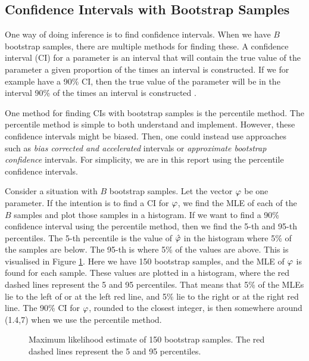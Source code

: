 
\subsection{Confidence Intervals with Bootstrap Samples}
\label{theory_ci_bootstrap}
One way of doing inference is to find confidence intervals. When we have $B$ bootstrap samples, there are multiple methods for finding these.  
A confidence interval (CI) for a parameter is an interval that will contain the true value of the parameter a given proportion of the times an interval is constructed. If we for example have a 90\% CI, then the true value of the parameter will be in the interval 90\% of the times an interval is constructed \citep{bootstrap}.

One method for finding CIs with bootstrap samples is the percentile method. The percentile method is simple to both understand and implement. However, these confidence intervals might be biased. Then, one could instead use approaches such as \textit{bias corrected and accelerated} intervals or \textit{approximate bootstrap confidence} intervals. For simplicity, we are in this report using the percentile confidence intervals. 


Consider a situation with $B$ bootstrap samples. Let the vector $\varphi$ be one parameter. If the intention is to find a CI for $\varphi$, we find the MLE of each of the $B$ samples and plot those samples in a histogram. If we want to find a 90\% confidence interval using the percentile method, then we find the 5-th and 95-th percentiles. The 5-th percentile is the value of $\hat{\varphi}$ in the histogram where 5\% of the samples are below. The 95-th is where 5\% of the values are above. This is visualised in Figure \ref{percentile_ci_example}. Here we have 150 bootstrap samples, and the MLE of $\varphi$ is found for each sample. These values are plotted in a histogram, where the red dashed lines represent the 5 and 95 percentiles. That means that 5\% of the MLEs lie to the left of or at the left red line, and 5\% lie to the right or at the right red line. The 90\% CI for $\varphi$, rounded to the closest integer, is then somewhere around (1.4,7) when we use the percentile method.
\begin{figure}
    \centering
    
    \caption[Bootstrap Example]{Maximum likelihood estimate of 150 bootstrap samples. The red dashed lines represent the 5 and 95 percentiles.}
    \label{percentile_ci_example}
\end{figure}

